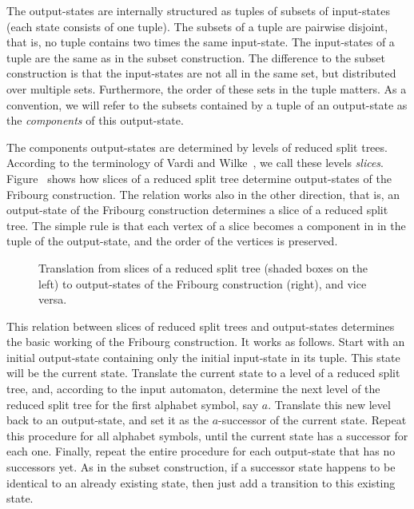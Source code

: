 The output-states are internally structured as tuples of subsets of input-states (each state consists of one tuple). The subsets of a tuple are pairwise disjoint, that is, no tuple contains two times the same input-state. The input-states of a tuple are the same as in the subset construction. The difference to the subset construction is that the input-states are not all in the same set, but distributed over multiple sets. Furthermore, the order of these sets in the tuple matters. As a convention, we will refer to the subsets contained by a tuple of an output-state as the \textit{components} of this output-state.

The components output-states are determined by levels of reduced split trees. According to the terminology of Vardi and Wilke~\cite{vardi2007automata}, we call these levels \textit{slices}. Figure~\label{slices} shows how slices of a reduced split tree determine output-states of the Fribourg construction. The relation works also in the other direction, that is, an output-state of the Fribourg construction determines a slice of a reduced split tree. The simple rule is that each vertex of a slice becomes a component in in the tuple of the output-state, and the order of the vertices is preserved.

\begin{figure}[htb]
\centering
\Slices
\caption{Translation from slices of a reduced split tree (shaded boxes on the left) to output-states of the Fribourg construction (right), and vice versa.}
\label{slices}
\end{figure}

This relation between slices of reduced split trees and output-states determines the basic working of the Fribourg construction. It works as follows. Start with an initial output-state containing only the initial input-state in its tuple. This state will be the current state. Translate the current state to a level of a reduced split tree, and, according to the input automaton, determine the next level of the reduced split tree for the first alphabet symbol, say $a$. Translate this new level back to an output-state, and set it as the $a$-successor of the current state. Repeat this procedure for all alphabet symbols, until the current state has a successor for each one. Finally, repeat the entire procedure for each output-state that has no successors yet. As in the subset construction, if a successor state happens to be identical to an already existing state, then just add a transition to this existing state.

